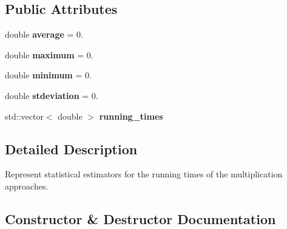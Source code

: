 \subsection*{Public Attributes}
\begin{DoxyCompactItemize}
\item 
\mbox{\label{structMatTestUtils_1_1PerfStats_a6b3cbd6a44fb070074555ab46918310d}} 
double {\bfseries average} = 0.
\item 
\mbox{\label{structMatTestUtils_1_1PerfStats_a584afc89a2781a9c6264bc7480439e21}} 
double {\bfseries maximum} = 0.
\item 
\mbox{\label{structMatTestUtils_1_1PerfStats_a032e057a96d030ef36355b5aac4fe596}} 
double {\bfseries minimum} = 0.
\item 
\mbox{\label{structMatTestUtils_1_1PerfStats_a103f9bae3107f94f33ff758551a1e434}} 
double {\bfseries stdeviation} = 0.
\item 
\mbox{\label{structMatTestUtils_1_1PerfStats_afb16d607f11552c526b636154d907a53}} 
std\+::vector$<$ double $>$ {\bfseries running\+\_\+times}
\end{DoxyCompactItemize}


\subsection{Detailed Description}
Represent statistical estimators for the running times of the multiplication approaches. 

\subsection{Constructor \& Destructor Documentation}
\mbox{\label{structMatTestUtils_1_1PerfStats_a3f58c1e90e5b3c9266b25ba162d34a14}} 
